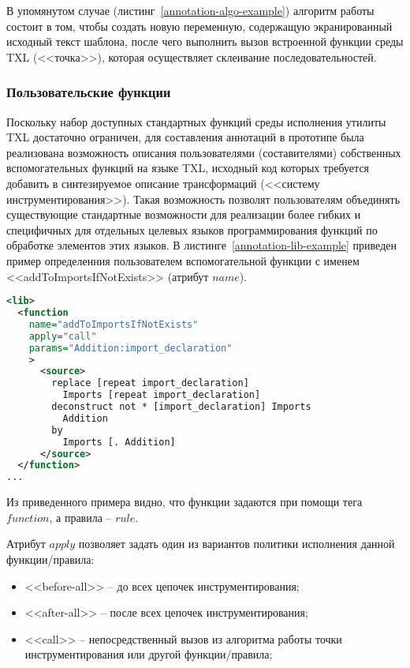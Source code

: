 В упомянутом случае (листинг~\ref{annotation-algo-example}) алгоритм работы состоит в том, чтобы создать новую переменную, содержащую экранированный исходный текст шаблона, после чего выполнить вызов встроенной функции среды TXL (<<точка>>), которая осуществляет склеивание последовательностей.

\subsubsection{Пользовательские функции}

Поскольку набор доступных стандартных функций среды исполнения утилиты TXL достаточно ограничен, для составления аннотаций в прототипе была реализована возможность описания пользователями (составителями) собственных вспомогательных функций на языке TXL, исходный код которых требуется добавить в синтезируемое описание трансформаций (<<систему инструментирования>>).
Такая возможность позволят пользователям объединять существующие стандартные возможности для реализации более гибких и специфичных для отдельных целевых языков программирования функций по обработке элементов этих языков.
В листинге~\ref{annotation-lib-example} приведен пример определенния пользователем вспомогательной функции с именем <<addToImportsIfNotExists>> (атрибут $name$).

\begin{lstlisting}[frame=single, language=XML, label={annotation-lib-example}, caption={Пример описания вспомогательной функции.}]
<lib>
  <function
    name="addToImportsIfNotExists"
    apply="call"
    params="Addition:import_declaration"
    >
      <source>
        replace [repeat import_declaration]
          Imports [repeat import_declaration]
        deconstruct not * [import_declaration] Imports
          Addition
        by
          Imports [. Addition]
      </source>
  </function>
...
\end{lstlisting}

Из приведенного примера видно, что функции задаются при помощи тега $function$, а правила -- $rule$.

Атрибут $apply$ позволяет задать один из вариантов политики исполнения данной функции/правила:
\begin{itemize}[noitemsep]
  \item <<before-all>>  -- до всех цепочек инструментирования;
  \item <<after-all>>   -- после всех цепочек инструментирования;
  \item <<call>>        -- непосредственный вызов из алгоритма работы точки инструментирования или другой функции/правила;
\end{itemize}

